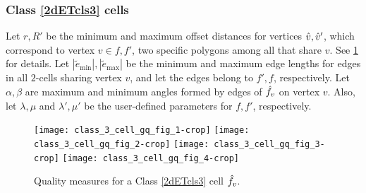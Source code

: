 \subsubsection{Class \ref{2dETcls3} cells}  \label{sssec:2dETcls3gq}
Let $r, R'$ be the minimum and maximum offset distances for vertices $\hat{v}, \hat{v}'$, which correspond to vertex $v \in f, f'$, two specific polygons among all that share $v$.
See \cref{fig:2dETcls3gq} for details.
Let $|\tilde{e}_{\min}|, |\tilde{e}_{\max}|$ be the minimum and maximum edge lengths for edges in all $2$-cells sharing vertex $v$, and let the edges belong to $f', f$, respectively.
Let $\alpha, \beta $ are maximum and minimum angles formed by edges of $\hat{f}_v$ on vertex $v$.
Also, let $\lambda, \mu$ and $\lambda', \mu'$ be the user-defined parameters for $f, f'$, respectively.

\begin{figure}[htp!]
      \centering
      \texttt{[image: class\_3\_cell\_gq\_fig\_1-crop]}
      \quad
      \texttt{[image: class\_3\_cell\_gq\_fig\_2-crop]}
      \quad
      \texttt{[image: class\_3\_cell\_gq\_fig\_3-crop]}
      \quad
      \texttt{[image: class\_3\_cell\_gq\_fig\_4-crop]}
      \caption{Quality measures for a Class \ref{2dETcls3} cell $\hat{f}_v$.
      }
      \label{fig:2dETcls3gq}
\end{figure}


